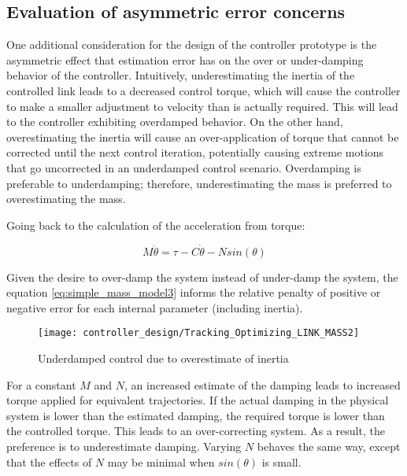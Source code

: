 \subsection{Evaluation of asymmetric error concerns}

One additional consideration for the design of the controller prototype is the asymmetric
effect that estimation error has on the over or under-damping behavior of the
controller. Intuitively,
underestimating the inertia of the controlled link leads to a decreased control
torque, which will cause the controller to make a smaller adjustment to velocity than is actually required. This will lead to the controller exhibiting overdamped behavior. On the
other hand, overestimating the inertia will cause an over-application of torque
that cannot be corrected until the next control iteration, potentially causing
extreme motions that go uncorrected in an underdamped control scenario. Overdamping is preferable to underdamping; therefore, underestimating the mass is preferred to overestimating the mass.

Going back to the calculation of the acceleration from torque:

\begin{equation} \label{eq:simple_mass_model3}
M \ddot{\theta} = \tau - C \dot{\theta} - N sin \left(\theta \right)
\end{equation}

Given the desire to over-damp the system instead of under-damp the system, the
equation \ref{eq:simple_mass_model3} informs the relative penalty of positive or negative error for
each internal parameter (including inertia).

\begin{figure}
\centering
\texttt{[image: controller\_design/Tracking\_Optimizing\_LINK\_MASS2]}
\caption{Underdamped control due to overestimate of inertia}
\label{fig:UnderdampedControl}
\end{figure}


For a constant $M$ and $N$, an increased estimate of the damping leads to 
increased torque applied for equivalent trajectories. If the actual damping in the physical system is lower than the estimated damping, the required
torque is lower than the controlled torque. This leads to an over-correcting
system. As a result, the preference is to underestimate damping. Varying $N$ behaves the same way, except that the effects of $N$ may be
minimal when $sin(\theta)$ is small.
